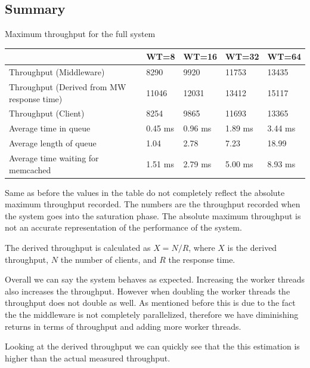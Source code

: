 \documentclass[11pt,a4paper]{article}
\begin{document}
\subsection{Summary}
%
\begin{center}
	{Maximum throughput for the full system}
	\begin{tabular}{|l|p{1.5cm}|p{1.5cm}|p{1.5cm}|p{1.5cm}|}
		\hline                                            & WT=8 & WT=16 & WT=32 & WT=64 \\ 
		\hline Throughput (Middleware)                    &  8290    &   9920    &   11753    &   13435    \\ 
		\hline Throughput (Derived from MW response time) &  11046   &   12031    &   13412    &   15117    \\ 
		\hline Throughput (Client)                        &  8254   &   9865    &    11693   &    13365   \\ 
		\hline Average time in queue                      &  0.45 ms   &    0.96 ms   &    1.89 ms   &   3.44 ms    \\ 
		\hline Average length of queue                    &  1.04   &  2.78    &    7.23    &   18.99    \\ 
		\hline Average time waiting for memcached         &  1.51 ms   &   2.79 ms    &    5.00 ms   &   8.93 ms    \\ 
		\hline 
	\end{tabular}
\end{center}
%
Same as before the values in the table do not completely reflect the absolute maximum throughput recorded.
%
The numbers are the throughput recorded when the system goes into the saturation phase.
%
The absolute maximum throughput is not an accurate representation of the performance of the system.
%
\par
%
The derived throughput is calculated as $X = N / R$, where $X$ is the derived throughput, $N$ the number of clients, and $R$ the response time.
%
\par
%
Overall we can say the system behaves as expected.
%
Increasing the worker threads also increases the throughput.
%
However when doubling the worker threads the throughput does not double as well.
%
As mentioned before this is due to the fact the the middleware is not completely parallelized, therefore we have diminishing returns in terms of throughput and adding more worker threads.
%
\par
%
Looking at the derived throughput we can quickly see that the this estimation is higher than the actual measured throughput.
\end{document}
